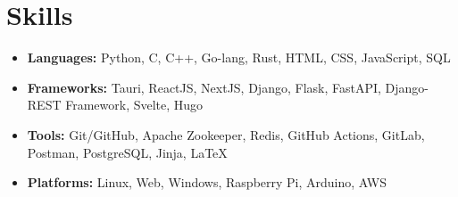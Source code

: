 \documentclass[7pt, legalpaper]{article}
\begin{document}
\section{Skills}
\begin{itemize}[leftmargin=*]
    \item \textbf{Languages:} Python, C, C++, Go-lang, Rust, HTML, CSS, JavaScript, SQL
    \item \textbf{Frameworks:} Tauri, ReactJS, NextJS, Django, Flask, FastAPI, Django-REST Framework, Svelte, Hugo
    \item \textbf{Tools:} Git/GitHub, Apache Zookeeper, Redis, GitHub Actions, GitLab, Postman, PostgreSQL, Jinja, LaTeX
    \item \textbf{Platforms:} Linux, Web, Windows, Raspberry Pi, Arduino, AWS
\end{itemize}

\end{document}
